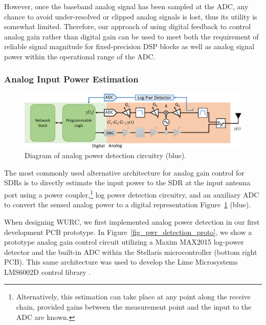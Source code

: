 	However, once the baseband analog signal has been sampled at the \ac{ADC}, any chance to avoid under-resolved or clipped analog signals is lost, thus its utility is somewhat limited.
	Therefore, our approach of using digital feedback to control analog gain rather than digital gain can be used to meet both the requirement of reliable signal magnitude for fixed-precision \ac{DSP} blocks as well as analog signal power within the operational range of the \ac{ADC}.


\subsubsection{Analog Input Power Estimation}
\label{sec_agc_analog_alt}

\begin{figure}[h] %
\centering
\includegraphics[width=0.9\linewidth]{./figs/agc/agc_diagrams_analog}
\caption{Diagram of analog power detection circuitry (blue).}
\label{fig_pwr_detection_diagram}
\end{figure}

	The most commonly used alternative architecture for analog gain control for \acp{SDR} is to directly estimate the input power to the \ac{SDR} at the input antenna port using a power coupler,\footnote{Alternatively, this estimation can take place at any point along the receive chain, provided gains between the measurement point and the input to the \ac{ADC} are known.} log power detection circuitry, and an auxiliary \ac{ADC} to convert the sensed analog power to a digital representation Figure~\ref{fig_pwr_detection_diagram} (blue).

	When designing \ac{WURC}, we first implemented analog power detection in our first development PCB prototype.
In Figure~\ref{fig_pwr_detection_proto}, we show a prototype analog gain control circuit utilizing a Maxim MAX2015 log-power detector and the built-in \ac{ADC} within the Stellaris microcontroller (bottom right PCB).
This same architecture was used to develop the Lime Microsystems LMS6002D control library \cite{guerra2013lms6002d}.

